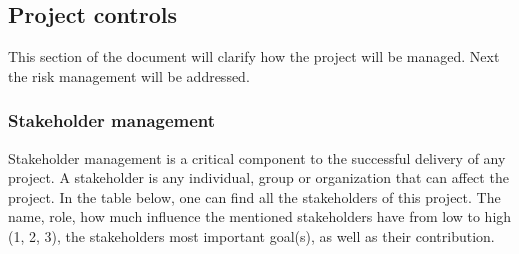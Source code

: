 \subsection{Project controls}\label{subsec:project-controls}

This section of the document will clarify how the project will be managed.
Next the risk management will be addressed.

\subsubsection{Stakeholder management}

Stakeholder management is a critical component to the successful delivery of any project.
A stakeholder is any individual, group or organization that can affect the project.
In the table below, one can find all the stakeholders of this project.
The name, role, how much influence the mentioned stakeholders have from low to high (1, 2, 3), the stakeholders most
important goal(s), as well as their contribution.

